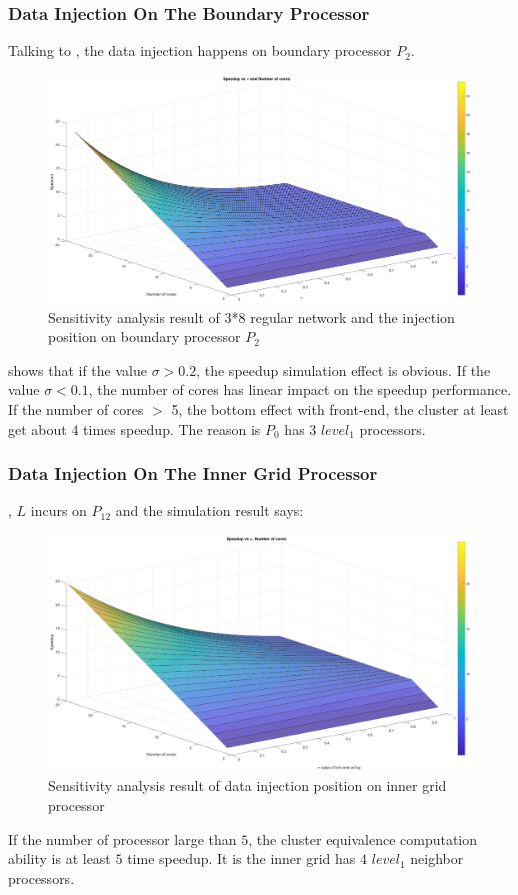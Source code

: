 \subsubsection{Data Injection On The Boundary Processor}
Talking to , the data injection happens on boundary processor $P_{2}$. 
\begin{figure}[!ht]
\centering
\includegraphics[width=1\columnwidth]{figure/sa3t8b.eps}
\caption{Sensitivity analysis result of 3*8 regular network and the injection position on boundary processor $P_{2}$}
\label{fig:sa3t8b}
\end{figure}
 shows that if the value $\sigma > 0.2$, the speedup simulation effect is obvious.   If the value $\sigma < 0.1$, the number of cores has linear impact on the speedup performance.   If the number of cores $>$ 5, the bottom effect with front-end, the cluster at least get about $4$ times speedup.   The reason is $P_{0}$ has $3$ $level_{1}$ processors.  

\newpage

\subsubsection{Data Injection On The Inner Grid Processor}
, $L$ incurs on $P_{12}$ and the simulation result says:
\begin{figure}[!ht]
\centering
\includegraphics[width=1\columnwidth]{figure/sa5t5i.eps}
\caption{Sensitivity analysis result of data injection position on inner grid processor}
\label{fig:sa5t5i}
\end{figure}
If the number of processor large than $5$, the cluster equivalence computation ability is at least $5$ time speedup.  It is the inner grid has $4$ $level_{1}$ neighbor processors.  
\newpage
